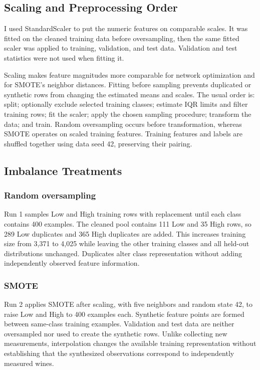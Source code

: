 \documentclass[11pt,letterpaper]{article}
\begin{document}
\subsection{Scaling and Preprocessing Order}
I used StandardScaler to put the numeric features on comparable scales. It was fitted on the cleaned training data before oversampling, then the same fitted scaler was applied to training, validation, and test data. Validation and test statistics were not used when fitting it.

Scaling makes feature magnitudes more comparable for network optimization and for SMOTE's neighbor distances. Fitting before sampling prevents duplicated or synthetic rows from changing the estimated means and scales. The usual order is: split; optionally exclude selected training classes; estimate IQR limits and filter training rows; fit the scaler; apply the chosen sampling procedure; transform the data; and train. Random oversampling occurs before transformation, whereas SMOTE operates on scaled training features. Training features and labels are shuffled together using data seed 42, preserving their pairing.

\subsection{Imbalance Treatments}
\subsubsection{Random oversampling}
Run 1 samples Low and High training rows with replacement until each class contains 400 examples. The cleaned pool contains 111 Low and 35 High rows, so 289 Low duplicates and 365 High duplicates are added. This increases training size from 3,371 to 4,025 while leaving the other training classes and all held-out distributions unchanged. Duplicates alter class representation without adding independently observed feature information.

\subsubsection{SMOTE}
Run 2 applies SMOTE after scaling, with five neighbors and random state 42, to raise Low and High to 400 examples each. Synthetic feature points are formed between same-class training examples. Validation and test data are neither oversampled nor used to create the synthetic rows. Unlike collecting new measurements, interpolation changes the available training representation without establishing that the synthesized observations correspond to independently measured wines.
\end{document}
